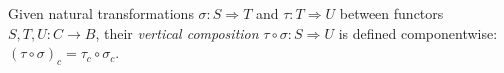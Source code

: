 Given natural transformations $\sigma: S \Rightarrow T$ and $\tau: T \Rightarrow U$ between functors $S, T, U: C \to B$, their \emph{vertical composition} $\tau \circ \sigma: S \Rightarrow U$ is defined componentwise: $(\tau \circ \sigma)_c = \tau_c \circ \sigma_c$.
